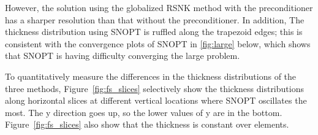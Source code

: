 However, the solution using the globalized RSNK method with the preconditioner has a sharper resolution than that without the preconditioner. In addition, The thickness distribution using SNOPT is ruffled along the trapezoid edges; this is consistent with the convergence plots of SNOPT in \ref{fig:large} below, which shows that SNOPT is having difficulty converging the large problem. 

To quantitatively measure the differences in the thickness distributions of the three methods, Figure~\ref{fig:fs_slices} 
selectively show the thickness distributions along horizontal slices at different vertical locations where SNOPT oscillates the most. The y direction goes up, so the lower values of y are in the bottom.  Figure~\ref{fig:fs_slices} also show that the thickness is constant over elements. 


